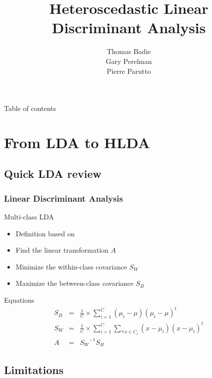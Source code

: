 \documentclass[smaller,pdf,svgnames]{beamer}
\title {Heteroscedastic Linear Discriminant Analysis}
\author[Thomas Badie \and Gary Perelman \and Pierre Parutto]{Thomas Badie\\Gary Perelman\\Pierre Parutto}
\begin{document}
\begin{frame}
  \maketitle
\end{frame}

\begin{frame}{Table of contents}
  \tableofcontents
\end{frame}

\section{From LDA to HLDA}

\subsection{Quick LDA review}

\begin{frame}
  \frametitle{Linear Discriminant Analysis}

  \begin{block}{Multi-class LDA}
    \begin{itemize}
    \item Definition based on \cite{bishop2006pattern}
    \item Find the linear transformation $A$
    \item Minimize the within-class covariance $S_W$
    \item Maximize the between-class covariance $S_B$
    \end{itemize}
  \end{block}

  \begin{block}{Equations}
    $$\begin{array}{ccl}
      S_B & = & \frac{1}{C} \times \sum\limits_{i = 1}^C (\mu_i - \mu)(\mu_i - \mu)^t \\
      S_W & = & \frac{1}{C} \times \sum\limits_{i = 1}^C \sum\limits_{\forall x \in C_i} (x - \mu_i)(x - \mu_i)^t\\
      A & = & {S_W}^{-1} S_B
    \end{array}$$
  \end{block}
\end{frame}

\subsection{Limitations}
\end{document}
